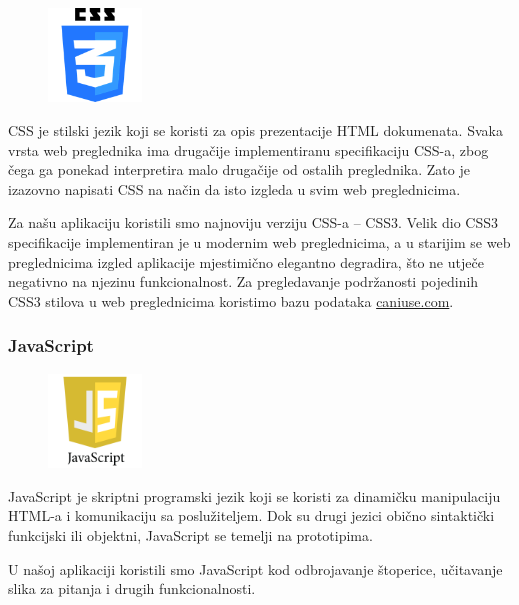 \documentclass{scrreprt}
\begin{document}
\begin{figure}
  \vspace{-10pt}
  \includegraphics[width=2.5cm]{logos/css}
  \vspace{-30pt}
\end{figure}

CSS je stilski jezik koji se koristi za opis prezentacije HTML dokumenata. Svaka
vrsta web preglednika ima drugačije implementiranu specifikaciju CSS-a, zbog
čega ga ponekad interpretira malo drugačije od ostalih preglednika. Zato je
izazovno napisati CSS na način da isto izgleda u svim web
preglednicima.\cite{css}

Za našu aplikaciju koristili smo najnoviju verziju CSS-a -- CSS3. Velik dio CSS3
specifikacije implementiran je u modernim web preglednicima, a u starijim se web
preglednicima izgled aplikacije mjestimično elegantno degradira, što ne utječe
negativno na njezinu funkcionalnost. Za pregledavanje podržanosti pojedinih CSS3
stilova u web preglednicima koristimo bazu podataka \url{caniuse.com}.

\subsubsection{JavaScript}

\begin{figure}
  \vspace{-10pt}
  \includegraphics[width=2.5cm]{logos/javascript}
  \vspace{-30pt}
\end{figure}

JavaScript je skriptni programski jezik koji se koristi za dinamičku
manipulaciju HTML-a i komunikaciju sa poslužiteljem. Dok su drugi jezici obično
sintaktički funkcijski ili objektni, JavaScript se temelji na
prototipima.\cite{js}

U našoj aplikaciji koristili smo JavaScript kod odbrojavanje štoperice,
učitavanje slika za pitanja i drugih funkcionalnosti.
\end{document}

